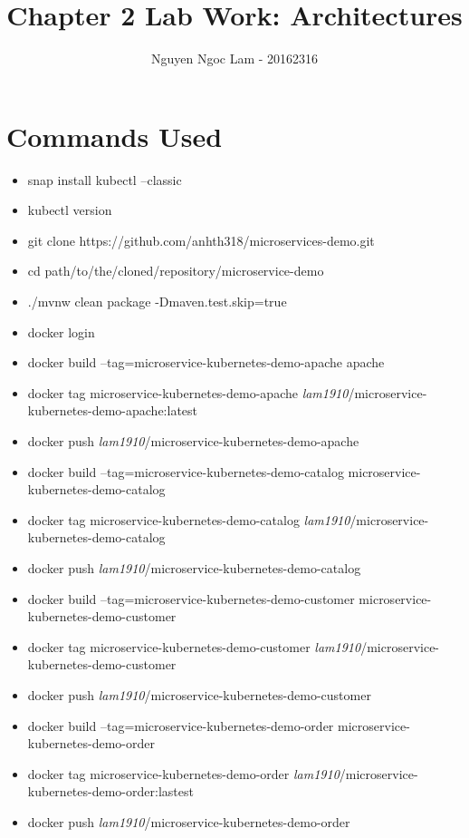 \documentclass[11pt,a4paper]{article}
\title{Chapter 2 Lab Work: Architectures}
\date{\displaydate{date}}
\author{Nguyen Ngoc Lam - 20162316}
\begin{document}
  	\maketitle
  	\newpage
  	\tableofcontents
  	\newpage
  	
  	\section{Commands Used}
  	\label{sec:cmd}
  	\begin{itemize}
  		\item snap install kubectl --classic
  		\item kubectl version
  		\item git clone https://github.com/anhth318/microservices-demo.git
  		\item cd path/to/the/cloned/repository/microservice-demo
  		\item ./mvnw clean package -Dmaven.test.skip=true
  		\item docker login
  		\item docker build --tag=microservice-kubernetes-demo-apache apache
  		\item docker tag microservice-kubernetes-demo-apache \emph{lam1910}/microservice-kubernetes-demo-apache:latest
  		\item docker push \emph{lam1910}/microservice-kubernetes-demo-apache
  		\item docker build --tag=microservice-kubernetes-demo-catalog microservice-kubernetes-demo-catalog
  		\item docker tag microservice-kubernetes-demo-catalog \emph{lam1910}/microservice-kubernetes-demo-catalog
		\item docker push \emph{lam1910}/microservice-kubernetes-demo-catalog
		\item docker build --tag=microservice-kubernetes-demo-customer microservice-kubernetes-demo-customer
		\item docker tag microservice-kubernetes-demo-customer \emph{lam1910}/microservice-kubernetes-demo-customer
		\item docker push \emph{lam1910}/microservice-kubernetes-demo-customer
		\item docker build --tag=microservice-kubernetes-demo-order microservice-kubernetes-demo-order
		\item docker tag microservice-kubernetes-demo-order \emph{lam1910}/microservice-kubernetes-demo-order:lastest
		\item docker push \emph{lam1910}/microservice-kubernetes-demo-order
  	\end{itemize}
\end{document}
